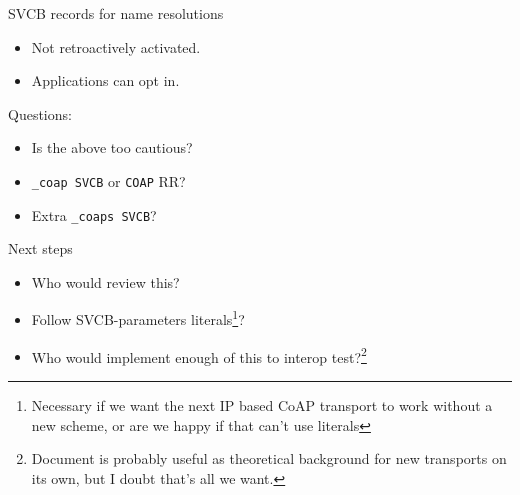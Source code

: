 \begin{frame}{SVCB records for name resolutions}\Large
  \begin{itemize}
    \item Not retroactively activated.
    \item Applications can opt in.
  \end{itemize}

  \bigskip

  Questions:

  \begin{itemize}
    \item Is the above too cautious?
    \item \texttt{\_coap SVCB} or \texttt{COAP} RR?
    \item Extra \texttt{\_coaps SVCB}?
  \end{itemize}
\end{frame}

\begin{frame}{Next steps}\Large
  \begin{itemize}
    \item Who would review this?
    \item Follow SVCB-parameters literals\footnote{Necessary if we want the next IP based CoAP transport to work without a new scheme, or are we happy if that can't use literals}?
    \item Who would implement enough of this to interop test?\footnote{Document is probably useful as theoretical background for new transports on its own, but I doubt that's all we want.}
  \end{itemize}
\end{frame}


